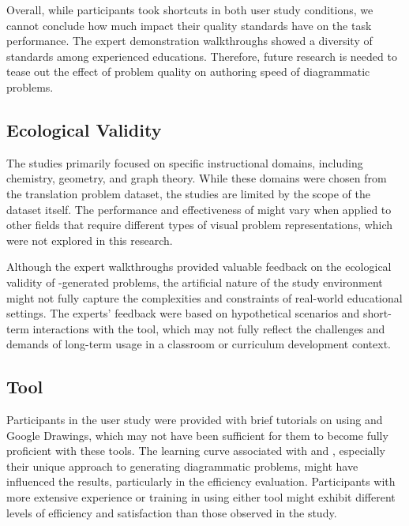 Overall, while participants took shortcuts in both user study conditions, we cannot conclude how much impact their quality standards have on the task performance. The expert demonstration walkthroughs showed a diversity of standards among experienced educations. Therefore, future research is needed to tease out the effect of problem quality on authoring speed of diagrammatic problems.

\subsection{Ecological Validity}

The studies primarily focused on specific instructional domains, including chemistry, geometry, and graph theory. While these domains were chosen from the translation problem dataset, the studies are limited by the scope of the dataset itself. The performance and effectiveness of \Edgeworth might vary when applied to other fields that require different types of visual problem representations, which were not explored in this research.

Although the expert walkthroughs provided valuable feedback on the ecological validity of \Edgeworth-generated problems, the artificial nature of the study environment might not fully capture the complexities and constraints of real-world educational settings. The experts' feedback were based on hypothetical scenarios and short-term interactions with the tool, which may not fully reflect the challenges and demands of long-term usage in a classroom or curriculum development context.

\subsection{Tool}
Participants in the user study were provided with brief tutorials on using \Edgeworth and Google Drawings, which may not have been sufficient for them to become fully proficient with these tools. The learning curve associated with \Penrose and \Edgeworth, especially their unique approach to generating diagrammatic problems, might have influenced the results, particularly in the efficiency evaluation. Participants with more extensive experience or training in using either tool might exhibit different levels of efficiency and satisfaction than those observed in the study.


